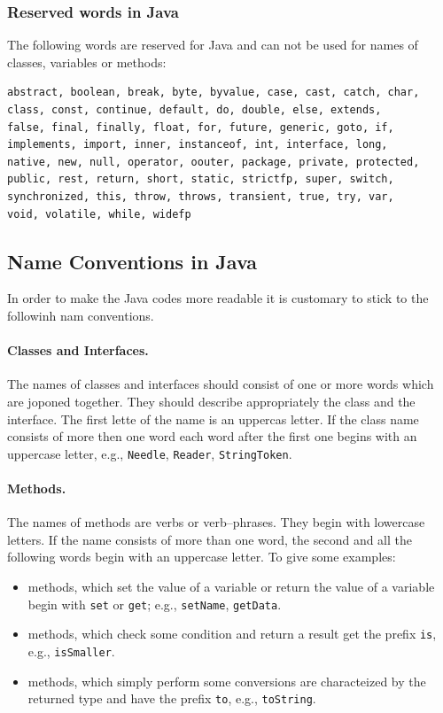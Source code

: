 \subsubsection{Reserved words in Java}
The following words are reserved for Java and can not be used for names
of classes, variables or methods:
\begin{verbatim}
abstract, boolean, break, byte, byvalue, case, cast, catch, char,
class, const, continue, default, do, double, else, extends,
false, final, finally, float, for, future, generic, goto, if,
implements, import, inner, instanceof, int, interface, long,
native, new, null, operator, oouter, package, private, protected, 
public, rest, return, short, static, strictfp, super, switch, 
synchronized, this, throw, throws, transient, true, try, var,
void, volatile, while, widefp
\end{verbatim}


\subsection{Name Conventions in Java}
In order to make the Java codes more readable it is customary to stick
to the followinh nam conventions.

\paragraph{Classes and Interfaces.} The names of classes and interfaces
  should consist of one or more words which are joponed together. They
  should describe appropriately the class and the interface. 
The first lette of the name is an uppercas letter. If the
  class name consists of more then one word each word after the first
  one begins with an uppercase letter, e.g., \verb|Needle|,
  \verb|Reader|, \verb|StringToken|.

\paragraph{Methods.} The names of methods are verbs or verb--phrases. 
  They begin with lowercase letters. If the name consists of
  more than one word, the second and all the following words begin
  with an uppercase letter. To give some examples:
\begin{itemize}
\item methods, which set the value of a variable or return the value of
  a variable begin with \verb|set| or \verb|get|; e.g.,
  \verb|setName|, \verb|getData|.
\item methods, which check some condition and return a result  get the
  prefix \verb|is|, e.g., \verb|isSmaller|.
\item methods, which simply perform some conversions are characteized
  by the returned type and have the prefix \verb|to|, e.g.,
  \verb|toString|.
\end{itemize}

